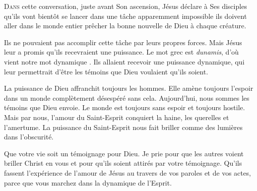 



\lettrine{D}{ans} cette conversation, juste avant Son ascension,
 Jésus déclare à Ses disciples qu'ils vont bientôt se lancer
 dans une tâche apparemment impossible\frcolon{}
 ils doivent aller dans le monde entier prêcher la bonne nouvelle
 de Dieu à chaque créature.

Ils ne pouvaient pas accomplir cette tâche par leurs propres forces.
 Mais Jésus leur a promis qu'ils recevraient une puissance.
 Le mot grec est \emph{dunamis}, d'où vient notre mot \Og dynamique \Fg{}.
 Ils allaient recevoir une puissance dynamique, qui leur permettrait
 d'être les témoins que Dieu voulaient qu'ils soient.


La puissance de Dieu affranchit toujours les hommes.
 Elle amène toujours l'espoir dans un monde complètement désespéré
 sans cela. Aujourd'hui, nous sommes les témoins que Dieu envoie.
 Le monde est toujours sans espoir et toujours hostile. Mais par nous,
 l'amour du Saint-Esprit conquiert la haine, les querelles et l'amertume.
 La puissance du Saint-Esprit nous fait briller
 comme des lumières dans l'obscurité.

Que votre vie soit un témoignage pour Dieu.
 Je prie pour que les autres voient briller Christ en vous
 et pour qu'ils soient attirés par votre témoignage.
 Qu'ils fassent l'expérience de l'amour de Jésus au travers de vos paroles
 et de vos actes, parce que vous marchez dans la dynamique de l'Esprit.

\dvrule





